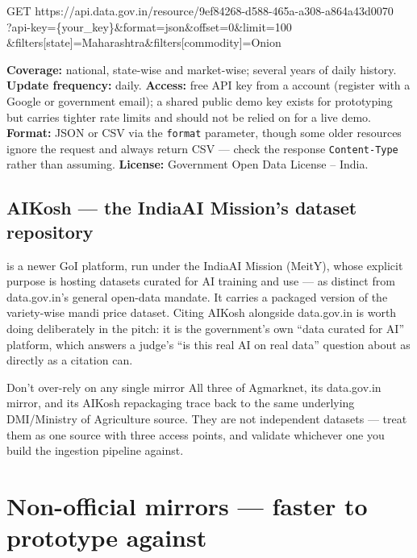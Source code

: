 \documentclass[11pt]{article}
\begin{document}
\begin{codebox}
GET https://api.data.gov.in/resource/9ef84268-d588-465a-a308-a864a43d0070\\
    ?api-key=\{your\_key\}\&format=json\&offset=0\&limit=100\\
    \&filters[state]=Maharashtra\&filters[commodity]=Onion
\end{codebox}

\textbf{Coverage:} national, state-wise and market-wise; several years of daily history. \textbf{Update
frequency:} daily. \textbf{Access:} free API key from a  account (register with a Google
or government email); a shared public demo key exists for prototyping but carries tighter rate limits and
should not be relied on for a live demo. \textbf{Format:} JSON or CSV via the \texttt{format} parameter,
though some older resources ignore the request and always return CSV --- check the response
\texttt{Content-Type} rather than assuming. \textbf{License:} Government Open Data License -- India.

\subsection*{AIKosh --- the IndiaAI Mission's dataset repository}
 is a newer GoI platform, run under the IndiaAI Mission (MeitY), whose explicit
purpose is hosting datasets curated for AI training and use --- as distinct from data.gov.in's general
open-data mandate. It carries a packaged version of the variety-wise mandi price dataset. Citing AIKosh
alongside data.gov.in is worth doing deliberately in the pitch: it is the government's own ``data curated for
AI'' platform, which answers a judge's ``is this real AI on real data'' question about as directly as a
citation can.

\begin{warnbox}{Don't over-rely on any single mirror}
All three of Agmarknet, its data.gov.in mirror, and its AIKosh repackaging trace back to the same underlying
DMI/Ministry of Agriculture source. They are not independent datasets --- treat them as one source with three
access points, and validate whichever one you build the ingestion pipeline against.
\end{warnbox}

\clearpage
\section{Non-official mirrors --- faster to prototype against}
\end{document}
